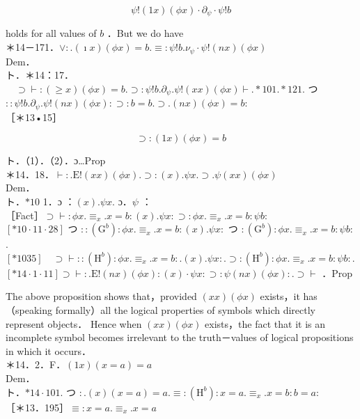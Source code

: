 \documentclass[10pt]{article}
\begin{document}
$$
\psi!(1 x)(\phi x) \cdot \partial_{\psi} \cdot \psi!b
$$

holds for all values of $b$ ．But we do have\\
＊14－171．$\vee: .(\imath x)(\phi x)=b . \equiv: \psi!b . \nu_{\psi} \cdot \psi!(n x)(\phi x)$\\
Dem．\\
ト．＊14：17．$\quad \supset \vdash:(\geqslant x)(\phi x)=b . \supset: \psi!b . \partial_{\psi} . \psi!(x x)(\phi x) \vdash . * 101 . * 121$. つ $:: \psi!b . \partial_{\psi} . \psi!(n x)(\phi x): \supset: b=b . \supset .(n x)(\phi x)=b:$\\
［＊13•15］


\begin{equation*}
\supset:(1 x)(\phi x)=b \tag{2}
\end{equation*}


ト．（1）．（2）．ɔ…Prop\\
＊14．18．$\vdash: . \mathrm{E}!(x x)(\phi x) . \supset:(x) . \psi x . \supset . \psi(x x)(\phi x)$\\
Dem．\\
ト．$* 10$ 1．ɔ ：$(x) . \psi x$. ɔ．$\psi$ ：\\
［Fact］$\supset \vdash: \phi x . \equiv_{x} . x=b:(x) . \psi x: \supset: \phi x . \equiv_{x} . x=b: \psi b:$\\
$[* 10 \cdot 11 \cdot 28]$ つ $::\left(\mathrm{G}^{b}\right): \phi x . \equiv_{x} . x=b:(x) . \psi x:$ つ $:\left(\mathrm{G}^{b}\right): \phi x . \equiv_{x} . x=b: \psi b:$. $[* 1035] \quad \supset \vdash::\left(\mathrm{H}^{b}\right): \phi x . \equiv_{x} . x=b: .(x) . \psi x: . \supset:\left(\mathrm{H}^{b}\right): \phi x . \equiv_{x} . x=b: \psi b:$. $[* 14 \cdot 1 \cdot 11] \supset \vdash: . \mathrm{E}!(n x)(\phi x):(x) \cdot \psi x: \supset: \psi(n x)(\phi x): . \supset \vdash$ ．Prop

The above proposition shows that，provided $(x x)(\phi x)$ exists，it has（speaking formally）all the logical properties of symbols which directly represent objects． Hence when $(x x)(\phi x)$ exists，the fact that it is an incomplete symbol becomes irrelevant to the truth－values of logical propositions in which it occurs．\\
＊14．2．F．$(1 x)(x=a)=a$\\
Dem．\\
ト．$* 14 \cdot 101$. つ $: .(x)(x=a)=a . \equiv:\left(\mathrm{H}^{b}\right): x=a . \equiv_{x} . x=b: b=a:$\\
［＊13．195］$\equiv: x=a . \equiv_{x} . x=a$
\end{document}

